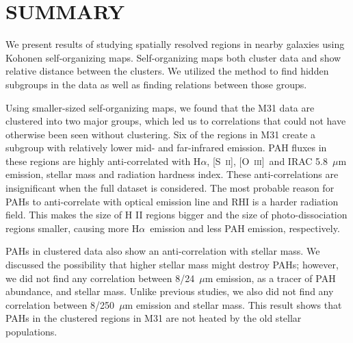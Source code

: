 \documentclass[useAMS,usenatbib]{mn2e}
\newcommand \halpha    {H$\alpha $}
\newcommand \sii {[S~\textsc{ii}]}
\newcommand \oiii {[O~\textsc{iii}]}
\begin{document}
\section{SUMMARY}
\label{sec: summary}

We present results of studying spatially resolved regions in nearby galaxies using Kohonen self-organizing maps.
Self-organizing maps both cluster data and show relative distance between the clusters. 
We utilized the method to find hidden subgroups in the data as well as finding relations between those groups.

Using smaller-sized self-organizing maps, we found that the M31 data are clustered into two major groups, which led us to correlations that could not have otherwise been seen without clustering.
Six of the regions in M31 create a subgroup with relatively lower mid- and far-infrared emission.
PAH fluxes in these regions are highly anti-correlated with \halpha, \sii, \oiii~and IRAC 5.8~$\mu$m emission, stellar mass and radiation hardness index.
These anti-correlations are insignificant when the full dataset is considered.
The most probable reason for PAHs to anti-correlate with optical emission line and RHI is a harder radiation field.
This makes the size of H {\sc II} regions bigger and the size of photo-dissociation regions smaller, causing more \halpha~emission and less PAH emission, respectively.

PAHs in clustered data also show an anti-correlation with stellar mass.
We discussed the possibility that higher stellar mass might destroy PAHs;
however, we did not find any correlation between 8/24~$\mu$m emission, as a tracer of PAH abundance, and stellar mass.
Unlike previous studies, we also did not find any correlation between 8/250~$\mu$m emission and stellar mass. 
This result shows that PAHs in the clustered regions in M31 are not heated by the old stellar populations.
\end{document}
